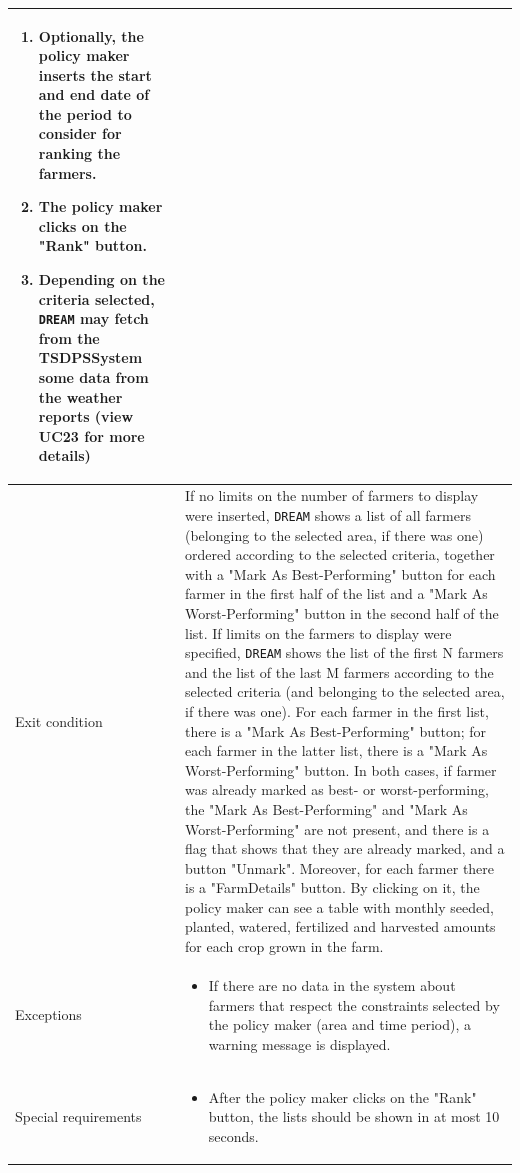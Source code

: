 \documentclass{article}
\begin{document}
\begin{longtable}{|p{3.5cm}|m{8cm}|}
\begin{enumerate}
    \item Optionally, the policy maker inserts the start and end date of the period to consider for ranking the farmers.
    \item The policy maker clicks on the "Rank" button.
    \item Depending on the criteria selected, \verb|DREAM| may fetch from the TSDPSSystem some data from the weather reports (view UC23 for more details)
 \end{enumerate}\\
 \hline
 Exit condition & If no limits on the number of farmers to display were inserted, \verb|DREAM| shows a list of all farmers (belonging to the selected area, if there was one) ordered according to the selected criteria, together with a "Mark As Best-Performing" button for each farmer in the first half of the list and a "Mark As Worst-Performing" button in the second half of the list. \newline
 If limits on the farmers to display were specified, \verb|DREAM| shows the list of the first N farmers and the list of the last M farmers according to the selected criteria (and belonging to the selected area, if there was one). For each farmer in the first list, there is a "Mark As Best-Performing" button; for each farmer in the latter list, there is a "Mark As Worst-Performing" button.
 \newline
 In both cases, if farmer was already marked as best- or worst-performing, the "Mark As Best-Performing" and "Mark As Worst-Performing" are not present, and there is a flag that shows that they are already marked, and a button "Unmark".
 \newline
 Moreover, for each farmer there is a "FarmDetails" button. By clicking on it, the policy maker can see a table with monthly seeded, planted, watered, fertilized and harvested amounts for each crop grown in the farm.\\
 \hline
 Exceptions & \begin{itemize}
    \item If there are no data in the system about farmers that respect the constraints selected by the policy maker (area and time period), a warning message is displayed.
 \end{itemize}\\
 \hline
 Special requirements &\begin{itemize}
     \item After the policy maker clicks on the "Rank" button, the lists should be shown in at most 10 seconds.
 \end{itemize}\\
 \hline
\end{longtable}
\end{document}
